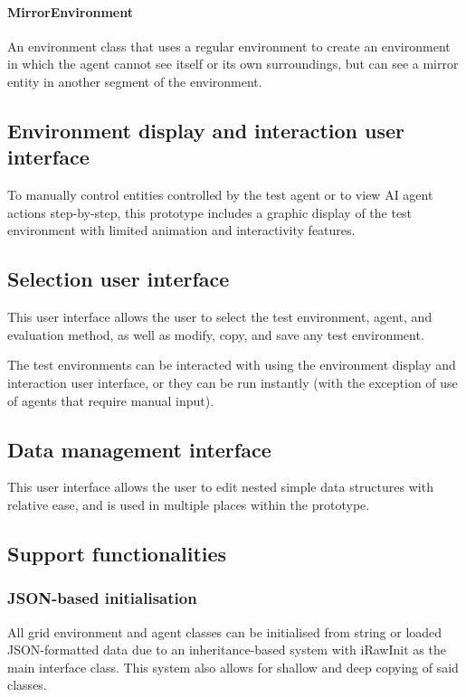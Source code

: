 \documentclass[masterthesis]{fer}
\begin{document}
\paragraph{MirrorEnvironment} An environment class that uses a regular environment to create an environment in which the agent cannot see itself or its own surroundings, but can see a mirror entity in another segment of the environment.

\subsection{Environment display and interaction user interface}
To manually control entities controlled by the test agent or to view AI agent actions step-by-step, this prototype includes a graphic display of the test environment with limited animation and interactivity features.

\subsection{Selection user interface}
This user interface allows the user to select the test environment, agent, and evaluation method, as well as modify, copy, and save any test environment.

The test environments can be interacted with using the environment display and interaction user interface, or they can be run instantly (with the exception of use of agents that require manual input).

\subsection{Data management interface}
This user interface allows the user to edit nested simple data structures with relative ease, and is used in multiple places within the prototype.

\subsection{Support functionalities}

\subsubsection{JSON-based initialisation}
All grid environment and agent classes can be initialised from string or loaded JSON-formatted data due to an inheritance-based system with iRawInit as the main interface class. This system also allows for shallow and deep copying of said classes.
\end{document}
